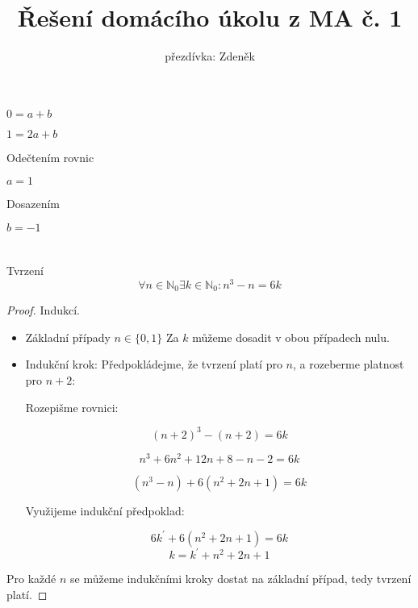 \documentclass[10pt,a4paper]{article}
\title{Řešení domácího úkolu z MA č. 1}
\author{přezdívka: Zdeněk}
\date{}
\theoremstyle{plain}
\theoremstyle{definition}
\begin{document}
\maketitle

\section{}

$0 = a + b$

$1 = 2a + b$

Odečtením rovnic

$a = 1$

Dosazením

$b = -1$


\section{}

Tvrzení \[ \forall n \in \mathbb{N}_0 \exists k \in \mathbb{N}_0 :  n^3 - n = 6k \]

\begin{proof} Indukcí.

\begin{itemize}
\item Základní případy $n \in \{0, 1\}$
Za $k$ můžeme dosadit v obou případech nulu.
\item Indukční krok: Předpokládejme, že tvrzení platí pro $n$, a rozeberme platnost pro $n+2$:

Rozepišme rovnici:


\[ (n+2)^3 - (n + 2) = 6k \]

\[ n^3 + 6n^2 + 12n + 8 - n - 2 = 6k \]

\[ (n^3 - n) + 6(n^2 + 2n + 1) = 6k \]

Využijeme indukční předpoklad:

\[ 6k^\prime + 6(n^2 + 2n + 1) = 6k \]
\[ k = k^\prime + n^2 + 2n + 1  \]


\end{itemize}


Pro každé $n$ se můžeme indukčními kroky dostat na základní případ, tedy tvrzení platí. 

\end{proof}
\end{document}
